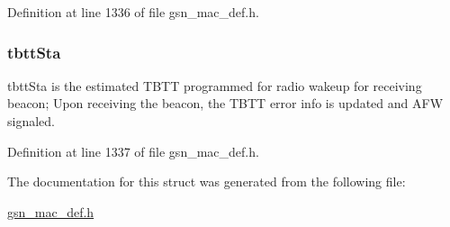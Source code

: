 Definition at line 1336 of file gsn\_\-mac\_\-def.h.

\hypertarget{a00134_a50a8d50f9a6fb53e3f5aa9d2dd67606a}{
\subsubsection[{tbttSta}]{ {\bf tbttSta}}}
\label{a00134_a50a8d50f9a6fb53e3f5aa9d2dd67606a}
tbttSta is the estimated TBTT programmed for radio wakeup for receiving beacon; Upon receiving the beacon, the TBTT error info is updated and AFW signaled. 

Definition at line 1337 of file gsn\_\-mac\_\-def.h.



The documentation for this struct was generated from the following file:\begin{DoxyCompactItemize}
\item 
\hyperlink{a00522}{gsn\_\-mac\_\-def.h}\end{DoxyCompactItemize}
